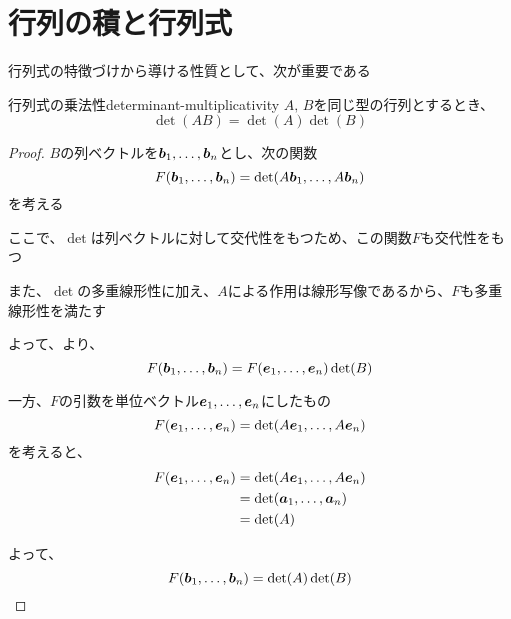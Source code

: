 \documentclass[../../../topic_linear-algebra]{subfiles}
\begin{document}
\sectionline
\section{行列の積と行列式}

行列式の特徴づけから導ける性質として、次が重要である

\begin{theorem}{行列式の乗法性}{determinant-multiplicativity}
  $A,\,B$を同じ型の行列とするとき、
  \begin{equation*}
    \det(AB) = \det(A) \det(B)
  \end{equation*}
\end{theorem}

\begin{proof}
  $B$の列ベクトルを$\vb*{b}_1, \ldots, \vb*{b}_n$とし、次の関数
  \begin{equation*}
    F(\vb*{b}_1, \ldots, \vb*{b}_n) = \det(A\vb*{b}_1, \ldots, A\vb*{b}_n)
  \end{equation*}
  を考える

  ここで、$\det$は列ベクトルに対して交代性をもつため、この関数$F$も交代性をもつ

  また、$\det$の多重線形性に加え、$A$による作用は線形写像であるから、$F$も多重線形性を満たす

  \br

  よって、より、
  \begin{equation*}
    F(\vb*{b}_1, \ldots, \vb*{b}_n) = F(\vb*{e}_1, \ldots, \vb*{e}_n) \det(B)
  \end{equation*}

  \br

  一方、$F$の引数を単位ベクトル$\vb*{e}_1, \ldots, \vb*{e}_n$にしたもの
  \begin{equation*}
    F(\vb*{e}_1, \ldots, \vb*{e}_n) = \det(A\vb*{e}_1, \ldots, A\vb*{e}_n)
  \end{equation*}
  を考えると、
  \begin{align*}
    F(\vb*{e}_1, \ldots, \vb*{e}_n) & = \det(A\vb*{e}_1, \ldots, A\vb*{e}_n) \\
                                    & = \det(\vb*{a}_1, \ldots, \vb*{a}_n)   \\
                                    & = \det(A)
  \end{align*}

  \br

  よって、
  \begin{equation*}
    F(\vb*{b}_1, \ldots, \vb*{b}_n) = \det(A) \det(B)
  \end{equation*}


\end{proof}
\end{document}
